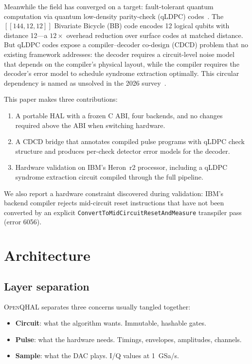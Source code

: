 \documentclass[aps,prApplied,twocolumn,superscriptaddress,floatfix]{revtex4-2}
\begin{document}
Meanwhile the field has converged on a target: fault-tolerant quantum
computation via quantum low-density parity-check (qLDPC)
codes~\cite{bravyi2024high}. The $[[144,12,12]]$ Bivariate Bicycle (BB)
code encodes 12 logical qubits with distance 12---a $12\times$ overhead
reduction over surface codes at matched distance. But qLDPC codes expose
a compiler--decoder co-design (CDCD) problem that no existing framework
addresses: the decoder requires a circuit-level noise model that depends
on the compiler's physical layout, while the compiler requires the
decoder's error model to schedule syndrome extraction optimally. This
circular dependency is named as unsolved in the 2026
survey~\cite{zhu2026ftqc}.

This paper makes three contributions:
\begin{enumerate}
  \item A portable HAL with a frozen C ABI, four backends, and no
        changes required above the ABI when switching hardware.
  \item A CDCD bridge that annotates compiled pulse programs with qLDPC
        check structure and produces per-check detector error models for
        the decoder.
  \item Hardware validation on IBM's Heron~r2 processor, including a
        qLDPC syndrome extraction circuit compiled through the full
        pipeline.
\end{enumerate}

We also report a hardware constraint discovered during validation:
IBM's backend compiler rejects mid-circuit reset instructions that have
not been converted by an explicit \texttt{ConvertToMidCircuitReset\-AndMeasure}
transpiler pass (error 6056).

\section{Architecture}
\label{sec:arch}

\subsection{Layer separation}

\textsc{OpenQHAL} separates three concerns usually tangled together:
\begin{itemize}
  \item \textbf{Circuit}: what the algorithm wants. Immutable, hashable
        gates.
  \item \textbf{Pulse}: what the hardware needs. Timings, envelopes,
        amplitudes, channels.
  \item \textbf{Sample}: what the DAC plays. I/Q values at
        1~GSa/s.
\end{itemize}
\end{document}
